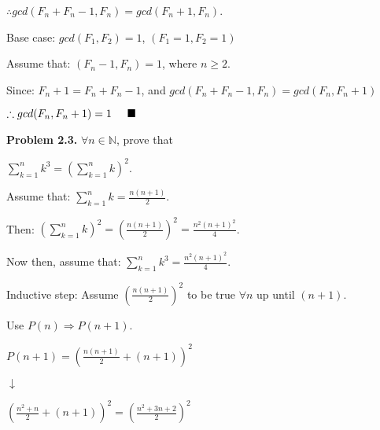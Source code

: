 \documentclass{article}
\begin{document}
\vspace{0.2cm}

$\therefore gcd(F_n + F_n-1, F_n) = gcd(F_n+1, F_n)$.

\vspace{0.2cm}

Base case: $gcd(F_1, F_2) = 1$, \hspace{0.2cm} $(F_1 = 1, F_2 = 1)$

\vspace{0.2cm}

Assume that: $(F_n-1, F_n) = 1$, \hspace{0.2cm} where $n \geq 2$.

\vspace{0.2cm}

Since: $F_n+1 = F_n + F_n-1$, and $gcd(F_n + F_n-1, F_n) = gcd(F_n, F_n+1)$

\vspace{0.2cm}

$\therefore gcd(F_n, F_n+1) = 1 \hspace{0.5cm} \blacksquare$

\vspace{0.5cm}

\textbf{Problem 2.3.} $\forall n \in \mathbb{N}$, prove that

\begin{center}
	$\displaystyle\sum_{k=1}^{n} k^3 = \left(\displaystyle\sum_{k=1}^{n} k\right)^2$.
\end{center}

Assume that: $\displaystyle\sum_{k=1}^{n} k = \frac{n(n+1)}{2}$.

Then: 	$\left(\displaystyle\sum_{k=1}^{n} k \right)^2 =  \left(\frac{n(n+1)}{2}\right)^2 = \frac{n^2(n+1)^2}{4}$.

Now then, assume that: $\displaystyle\sum_{k=1}^{n} k^3 = \frac{n^2(n+1)^2}{4}$.

Inductive step: Assume $\left(\frac{n(n+1)}{2}\right)^2$ to be true $\forall n$ up until $(n+1)$. 

Use $P(n) \Rightarrow P(n+1)$.

\vspace{0.5cm}

$P(n+1) = \left(\frac{n(n+1)}{2} + (n+1) \right)^2$

\vspace{0.2cm}
\hspace{2cm} $\downarrow$
\vspace{0.2cm}


$\left(\frac{n^2+n}{2} + (n+1)\right)^2 = \left(\frac{n^2+3n+2}{2}\right)^2$
\end{document}
